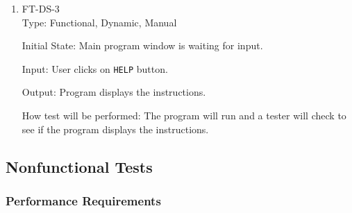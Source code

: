 \documentclass[12pt, titlepage]{article}
\begin{document}
\begin{enumerate}




\item{FT-DS-3}\\
Type: Functional, Dynamic, Manual

Initial State: Main program window is waiting for input. %

Input: User clicks on \texttt{HELP} button.

Output: Program displays the instructions.

How test will be performed: The program will run and a tester will check to see if the program displays the instructions.
\end{enumerate}

\subsection{Nonfunctional Tests}

\subsubsection{Performance Requirements}
\end{document}
